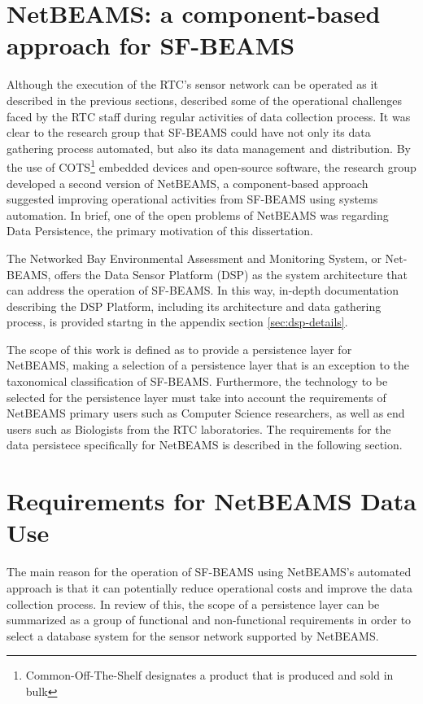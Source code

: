 \section{NetBEAMS: a component-based approach for SF-BEAMS}
\label{sec:problem-requirements}

Although the execution of the RTC's sensor network can be operated as it
described in the previous sections, \cite{netbeams2009} described some of the
operational challenges faced by the RTC staff during regular activities of
data collection process. It was clear to the research group that SF-BEAMS
could have not only its data gathering process automated, but also its data
management and distribution. By the use of COTS\footnote{Common-Off-The-Shelf
designates a product that is produced and sold in bulk} embedded devices and
open-source \cite{open-source} software, the research group developed a second
version of NetBEAMS, a component-based approach suggested improving operational
activities from SF-BEAMS using systems automation. In brief, one of the open
problems of NetBEAMS was regarding Data Persistence, the primary motivation of
this dissertation.

The Networked Bay Environmental Assessment and Monitoring System, or Net-BEAMS,
offers the Data Sensor Platform (DSP) \cite{netbeams2009} as the system
architecture that can address the operation of SF-BEAMS. In this way, in-depth
documentation describing the DSP Platform, including its architecture and data
gathering process, is provided startng in the appendix section
\ref{sec:dsp-details}.

The scope of this work is defined as to provide a persistence layer for
NetBEAMS, making a selection of a persistence layer that is an exception to the
taxonomical classification of SF-BEAMS. Furthermore, the technology to be
selected for the persistence layer must take into account the requirements of
NetBEAMS primary users such as Computer Science researchers, as well as end
users such as Biologists from the RTC laboratories. The requirements for the
data persistece specifically for NetBEAMS is described in the following section.

\section{Requirements for NetBEAMS Data Use}

The main reason for the operation of SF-BEAMS using NetBEAMS's automated
approach is that it can potentially reduce operational costs and improve the
data collection process. In review of this, the scope of a persistence layer
can be summarized as a group of functional and non-functional requirements in
order to select a database system for the sensor network supported by NetBEAMS.

